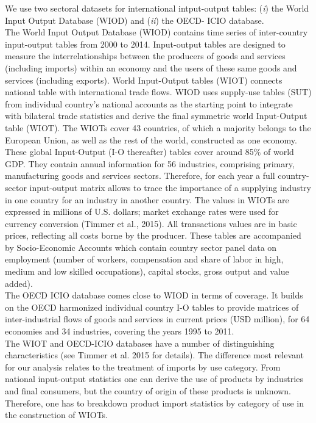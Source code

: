 \documentclass[11pt,a4paper]{article}
\begin{document}
We use two sectoral datasets for international intput-output tables: (\textit{i}) the World Input Output Database (WIOD) and (\textit{ii}) the OECD- ICIO database.\\
The World Input Output Database (WIOD) contains time series of inter-country input-output tables from 2000 to 2014. Input-output tables are designed to measure the interrelationships between the producers of goods and services (including imports) within an economy and the users of these same goods and services (including exports). World Input-Output tables (WIOT) connects national table with international trade flows. WIOD uses supply-use tables (SUT) from individual country’s national accounts as the starting point to integrate with bilateral trade statistics and derive the final symmetric world Input-Output table (WIOT). The WIOTs cover 43 countries, of which a majority belongs to the European Union, as well as the rest of the world, constructed as one economy. 
These global Input-Output (I-O thereafter) tables cover around 85$\%$ of world GDP. They contain annual information for 56 industries, comprising primary, manufacturing goods and services sectors. Therefore, for each year a full country-sector input-output matrix allows to trace the importance of a supplying industry in one country for an industry in another country. The values in WIOTs are expressed in millions of U.S. dollars; market exchange rates were used for currency conversion (Timmer et al., 2015). All transactions values are in basic prices, reflecting all costs borne by the producer. These tables are accompanied by Socio-Economic Accounts which contain country sector panel data on employment (number of workers, compensation and share of labor in high, medium and low skilled occupations), capital stocks, gross output and value added).\\
The OECD ICIO database comes close to WIOD in terms of coverage. It builds on the OECD harmonized individual country I-O tables to provide matrices of inter-industrial flows of goods and services in current prices (USD million), for 64 economies and 34 industries, covering the years 1995 to 2011. \\
The WIOT and OECD-ICIO databases have a number of distinguishing characteristics (see Timmer et al. 2015 for details). The difference most relevant for our analysis relates to the treatment of imports by use category. From national input-output statistics one can derive the use of products by industries and final consumers, but the country of origin of these products is unknown. Therefore, one has to breakdown product import statistics by category of use in the construction of WIOTs.\\
\end{document}
